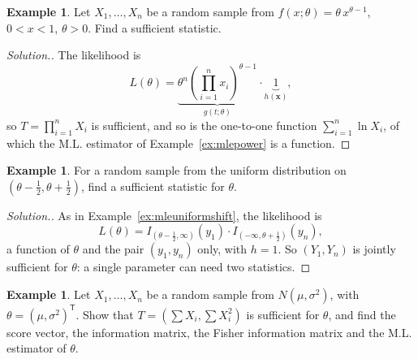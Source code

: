 \documentclass[12pt,a4paper]{report}
\theoremstyle{definition}
\newtheorem{example}[thm]{Example}
\theoremstyle{plain}
\newenvironment{solution}
  {\renewcommand{\qedsymbol}{}\begin{proof}[\textit{Solution}.]}
  {\end{proof}}
\begin{document}
\begin{example}
\label{ex:sufficientpower}
Let $X_1, \dots , X_n$ be a random sample from $f(x;\theta) = \theta\,
x^{\theta - 1}$, $0 < x < 1$, $\theta > 0$. Find a sufficient statistic.
\end{example}

\begin{solution}
The likelihood is
\[L(\theta) = \underbrace{\theta^n \left(\prod^n_{i = 1}x_i\right)^{\theta -
1}}_{g(t;\theta)}\cdot\underbrace{1}_{h(\mathbf x)} ,\]
so $T = \prod^n_{i = 1} X_i$ is sufficient, and so is the one-to-one function
$\sum_{i=1}^n\ln X_i$, of which the M.L. estimator of Example~\ref{ex:mlepower}
is a function.
\end{solution}

\begin{example}
\label{ex:sufficientuniformshift}
For a random sample from the uniform distribution on
$\left(\theta - \frac{1}{2}, \theta + \frac{1}{2}\right)$, find a sufficient
statistic for $\theta$.
\end{example}

\begin{solution}
As in Example~\ref{ex:mleuniformshift}, the likelihood is
\[L(\theta) = I_{\left(\theta - \frac12, \infty\right)}(y_1) \cdot I_{\left(-\infty,
\theta + \frac12\right)}(y_n),\]
a function of $\theta$ and the pair $(y_1,y_n)$ only, with $h = 1$. So
$(Y_1, Y_n)$ is jointly sufficient for $\theta$: a single parameter can need two
statistics.
\end{solution}

\begin{example}
\label{ex:normalfull}
Let $X_1, \dots, X_n$ be a random sample from $N(\mu, \sigma^2)$, with
$\theta = (\mu, \sigma^2)^{\mathsf T}$. Show that
$T = \left(\sum X_i, \sum X_i^2\right)$ is sufficient for $\theta$, and find the
score vector, the information matrix, the Fisher information matrix and the M.L.
estimator of $\theta$.
\end{example}
\end{document}
